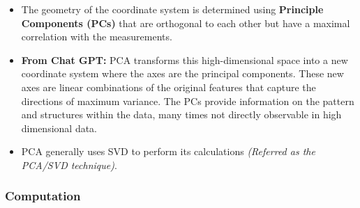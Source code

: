 \documentclass[11.5pt,a4paper]{article}
\begin{document}
\begin{itemize}
\begin{itemize}
\begin{itemize}
\begin{itemize}
            \end{itemize}
        \end{itemize}
        \item The geometry of the coordinate system is determined using \textbf{Principle Components (PCs)} that are orthogonal to each other but have a maximal correlation with the measurements.
        \item \textbf{From Chat GPT:} PCA transforms this high-dimensional space into a new coordinate system where the axes are the principal components. These new axes are linear combinations of the original features that capture the directions of maximum variance. The PCs provide information on the pattern and structures within the data, many times not directly observable in high dimensional data.
        \item PCA generally uses SVD to perform its calculations \textit{(Referred as the PCA/SVD technique)}.
    \end{itemize}
\end{itemize}

\subsubsection*{Computation}
\end{document}
